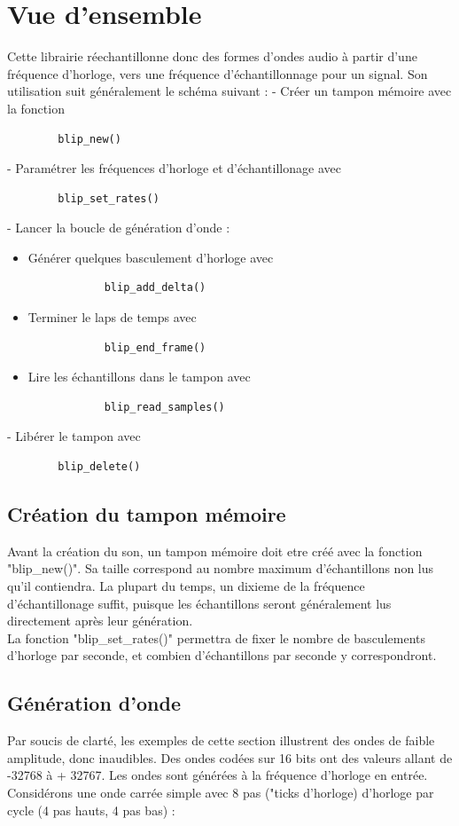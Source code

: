 \documentclass{report}
\begin{document}
\section*{Vue d'ensemble}
Cette librairie réechantillonne donc des formes d'ondes audio à partir d'une fréquence d'horloge, vers une fréquence d'échantillonnage pour un signal.
Son utilisation suit généralement le schéma suivant :
- Créer un tampon mémoire avec la fonction 
\begin{lstlisting} 
		blip_new() 
\end{lstlisting}
- Paramétrer les fréquences d'horloge et d'échantillonage avec 
\begin{lstlisting} 
		blip_set_rates() 
\end{lstlisting}
- Lancer la boucle de génération d'onde :
\begin{itemize}
	\item Générer quelques basculement d'horloge avec 
	\begin{lstlisting}
			blip_add_delta()
	\end{lstlisting}
	\item Terminer le laps de temps avec 
	\begin{lstlisting}
			blip_end_frame()
	\end{lstlisting}
	\item Lire les échantillons dans le tampon avec 
	\begin{lstlisting}
			blip_read_samples()
	\end{lstlisting}
\end{itemize}
- Libérer le tampon avec 
\begin{lstlisting}
		blip_delete()
\end{lstlisting}

\subsection{Création du tampon mémoire}
Avant la création du son, un tampon mémoire doit etre créé avec la fonction  "blip\_new()". Sa taille correspond au nombre maximum d'échantillons non lus qu'il contiendra. La plupart du temps, un dixieme de la fréquence d'échantillonage suffit, puisque les échantillons seront généralement lus directement après leur génération.\\
La fonction "blip\_set\_rates()" permettra de fixer le nombre de basculements d'horloge par seconde, et combien d'échantillons par seconde y correspondront. 
\subsection{Génération d'onde}
Par soucis de clarté, les exemples de cette section illustrent des ondes de faible amplitude, donc inaudibles. Des ondes codées sur 16 bits ont des valeurs allant de -32768 à + 32767.
Les ondes sont générées à la fréquence d'horloge en entrée.
Considérons une onde carrée simple avec 8 pas ("ticks d'horloge) d'horloge par cycle (4 pas hauts, 4 pas bas) : 
\end{document}
